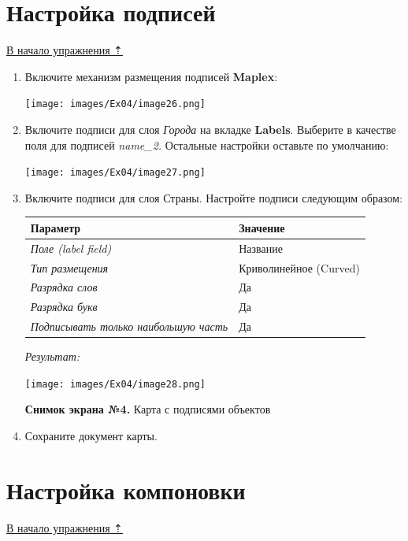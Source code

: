 \documentclass[12pt,]{book}
\begin{document}
\hypertarget{map-design-economic-labels}{%
\section{Настройка подписей}\label{map-design-economic-labels}}

\protect\hyperlink{map-design-economic}{В начало упражнения ⇡}

\begin{enumerate}
\def\labelenumi{\arabic{enumi}.}
\item
  Включите механизм размещения подписей \textbf{Maplex}:

  \texttt{[image: images/Ex04/image26.png]}
\item
  Включите подписи для слоя \emph{Города} на вкладке \textbf{Labels}. Выберите в качестве поля для подписей \emph{name\_2.} Остальные настройки оставьте по умолчанию:

  \texttt{[image: images/Ex04/image27.png]}
\item
  Включите подписи для слоя Страны. Настройте подписи следующим образом:

  \begin{longtable}[]{@{}ll@{}}
  \toprule
  \textbf{Параметр} & \textbf{Значение}\tabularnewline
  \midrule
  \endhead
  \emph{Поле (label field)} & Название\tabularnewline
  \emph{Тип размещения} & Криволинейное (Curved)\tabularnewline
  \emph{Разрядка слов} & Да\tabularnewline
  \emph{Разрядка букв} & Да\tabularnewline
  \emph{Подписывать только наибольшую часть} & Да\tabularnewline
  \bottomrule
  \end{longtable}

  \emph{Результат:}

  \texttt{[image: images/Ex04/image28.png]}

  \textbf{Снимок экрана №4.} Карта с подписями объектов
\item
  Сохраните документ карты.
\end{enumerate}

\hypertarget{map-design-economic-layout}{%
\section{Настройка компоновки}\label{map-design-economic-layout}}

\protect\hyperlink{map-design-economic}{В начало упражнения ⇡}
\end{document}
